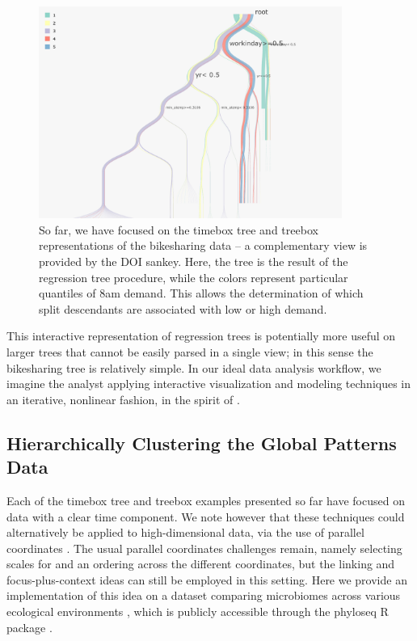 \documentclass[12pt]{article}
\begin{document}
\begin{figure}

{\centering \includegraphics[width=375px]{figure/bike_sankey}

}

\caption{So far, we have focused on the timebox tree and treebox representations
  of the bikesharing data -- a complementary view is provided by the DOI sankey.
  Here, the tree is the result of the regression tree procedure, while the
  colors represent particular quantiles of 8am demand. This allows the
  determination of which split descendants are associated with low or high
  demand.}\label{fig:bikesankey}
\end{figure}

This interactive representation of regression trees is potentially more
useful on larger trees that cannot be easily parsed in a single view; in
this sense the bikesharing tree is relatively simple. In our ideal data
analysis workflow, we imagine the analyst applying interactive
visualization and modeling techniques in an iterative, nonlinear
fashion, in the spirit of \citep{de2003visual}.

\subsection{Hierarchically Clustering the Global Patterns Data}\label{global_patterns}

Each of the timebox tree and treebox examples presented so far have
focused on data with a clear time component. We note however that these
techniques could alternatively be applied to high-dimensional data, via
the use of parallel coordinates \citep{inselberg1991parallel}. The usual
parallel coordinates challenges remain, namely selecting scales for and an
ordering across the different coordinates, but the linking and
focus-plus-context ideas can still be employed in this setting. Here we
provide an implementation of this idea on a dataset comparing microbiomes across
various ecological environments \citep{caporaso2011global}, which is publicly
accessible through the phyloseq R package \citep{mcmurdie2013phyloseq}.
\end{document}
